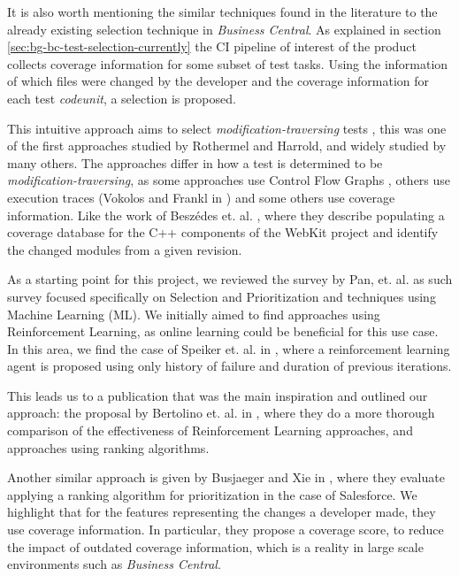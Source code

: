 It is also worth mentioning the similar techniques found in the literature to the already 
existing selection technique in \emph{Business Central}. As explained in section \ref{sec:bg-bc-test-selection-currently}
the CI pipeline of interest of the product collects coverage information for some subset of test tasks.
Using the information of which files were changed by the developer and the coverage information
for each test \emph{codeunit}, a selection is proposed. 

This intuitive approach aims to select \emph{modification-traversing} tests \cite{536955}, 
this was one of the first approaches studied by Rothermel and Harrold, and widely studied by many others.
The approaches differ in how a test is determined to be \emph{modification-traversing}, 
as some approaches use Control Flow Graphs \cite{366926}, others use execution traces (Vokolos and Frankl in \cite{Vokolos1997PythiaAR})
and some others use coverage information. Like the work of Beszédes et. al. \cite{Beszdes2012CodeCR}, where they
describe populating a coverage database for the C++ components of the WebKit project
and identify the changed modules from a given revision.

As a starting point for this project, we reviewed the survey by Pan, et. al. \cite{Pan2021TestCS} as 
such survey focused specifically on Selection and Prioritization and techniques using 
Machine Learning (ML). We initially aimed to find approaches using Reinforcement Learning,
as online learning could be beneficial for this use case. In this area, we find the case of
Speiker et. al. in \cite{DBLP:journals/corr/abs-1811-04122}, where a reinforcement learning agent is proposed using only
history of failure and duration of previous iterations.

This leads us to a publication that was the main inspiration and outlined our approach:
the proposal by Bertolino et. al. in \cite{Bertolino2020LearningtoRankVR}, where they do a
more thorough comparison of the effectiveness of Reinforcement Learning approaches, and
approaches using ranking algorithms.

Another similar approach is given by Busjaeger and Xie in \cite{Busjaeger2016LearningFT}, where they evaluate 
applying a ranking algorithm for prioritization in the case of Salesforce. We highlight that for the features representing
the changes a developer made, they use coverage information. In particular, they propose a coverage score, to 
reduce the impact of outdated coverage information, which is a reality in large scale environments such
as \emph{Business Central}.

